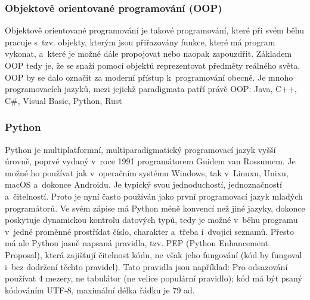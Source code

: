 \documentclass[a4paper]{extarticle}
\begin{document}
\subsubsection{Objektově orientované programování (OOP)}
Objektově orientované programování je takové programování, které při svém běhu pracuje s~tzv. objekty, kterým jsou přiřazovány funkce, které má program vykonat, a~které je možné dále propojovat nebo naopak zapouzdřit. Základem OOP tedy je, že se snaží pomocí objektů reprezentovat předměty reálného světa. OOP by se dalo označit za moderní přístup k~programování obecně.
Je mnoho programovacích jazyků, mezi jejichž paradigmata patří právě OOP: Java, C++, C\#, Visual Basic, Python, Rust
\subsubsection{Python}
Python je multiplatformní, multiparadigmatický programovací jazyk vyšší úrovně, poprvé vydaný v~roce 1991 programátorem Guidem van Rossumem. Je možné ho používat jak v~operačním systému Windows, tak v~Linuxu, Unixu, macOS a~dokonce Androidu. Je typický svou jednoduchostí, jednoznačností a~čitelností. Proto je nyní často používán jako první programovací jazyk mladých programátorů.
Ve svém zápise má Python méně konvencí než jiné jazyky, dokonce poskytuje dynamickou kontrolu datových typů, tedy je možné v~běhu programu v~jedné proměnné prostřídat číslo, charakter a~třeba i~dvojici seznamů. Přesto má ale Python jasně napsaná pravidla, tzv. PEP (Python Enhancement Proposal), která zajišťují čitelnost kódu, ne však jeho fungování (kód by fungoval i~bez dodržení těchto pravidel). Tato pravidla jsou například: Pro odsazování používat 4 mezery, ne tabulátor (ne velice populární pravidlo); kód má být psaný kódováním UTF-8, maximální délka řádku je 79 ad. 
\end{document}
